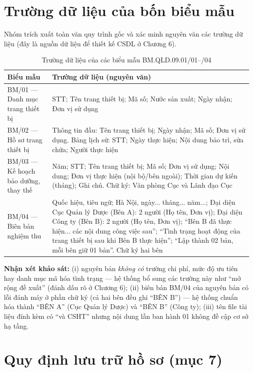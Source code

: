 \section{Trường dữ liệu của bốn biểu mẫu}

Nhóm trích xuất toàn văn quy trình gốc và xác minh nguyên văn các trường dữ liệu (đây là nguồn dữ liệu để thiết kế CSDL ở Chương 6).

\begin{table}[h]
\centering
\caption{Trường dữ liệu của các biểu mẫu BM.QLD.09.01/01--/04}
\label{tab:bieumau}
\begin{tabular}{P{3.1cm}P{11.9cm}}
\toprule
\textbf{Biểu mẫu} & \textbf{Trường dữ liệu (nguyên văn)} \\
\midrule
BM/01 --- Danh mục trang thiết bị & STT; Tên trang thiết bị; Mã số; Nước sản xuất; Ngày nhận; Đơn vị sử dụng \\
\addlinespace
BM/02 --- Hồ sơ trang thiết bị & Thông tin đầu: Tên trang thiết bị; Ngày nhận; Mã số; Đơn vị sử dụng. Bảng lịch sử: STT; Ngày thực hiện; Nội dung bảo trì, sửa chữa; Người thực hiện \\
\addlinespace
BM/03 --- Kế hoạch bảo dưỡng, thay thế & Năm; STT; Tên trang thiết bị; Mã số; Đơn vị sử dụng; Nội dung; Đơn vị thực hiện (nội bộ/bên ngoài); Thời gian dự kiến (tháng); Ghi chú. Chữ ký: Văn phòng Cục và Lãnh đạo Cục \\
\addlinespace
BM/04 --- Biên bản nghiệm thu & Quốc hiệu, tiêu ngữ; Hà Nội, ngày... tháng... năm...; Đại diện Cục Quản lý Dược (Bên A): 2 người (Họ tên, Đơn vị); Đại diện Công ty (Bên B): 2 người (Họ tên, Đơn vị); ``Bên B đã thực hiện... các nội dung công việc sau''; ``Tình trạng hoạt động của trang thiết bị sau khi Bên B thực hiện''; ``Lập thành 02 bản, mỗi bên giữ 01 bản''. Chữ ký hai bên \\
\bottomrule
\end{tabular}
\end{table}

\textbf{Nhận xét khảo sát:} (i) nguyên bản \emph{không có} trường chi phí, mức độ ưu tiên hay danh mục mã hóa tình trạng — hệ thống bổ sung các trường này như ``mở rộng đề xuất'' (đánh dấu rõ ở Chương 6); (ii) biên bản BM/04 của nguyên bản có lỗi đánh máy ở phần chữ ký (cả hai bên đều ghi ``BÊN B'') — hệ thống chuẩn hóa thành ``BÊN A'' (Cục Quản lý Dược) và ``BÊN B'' (Công ty); (iii) tên file tài liệu đính kèm có ``và CSHT'' nhưng nội dung lần ban hành 01 không đề cập cơ sở hạ tầng.

\section{Quy định lưu trữ hồ sơ (mục 7)}


